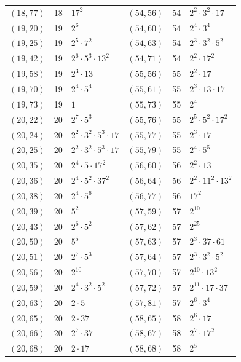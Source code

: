 \documentclass[11pt]{article}
\begin{document}
\begin{longtable}{@{}lrl@{\qquad}lrl@{}}
$(18,77)$ & 18 & $17^{2}$ & $(54,56)$ & 54 & $2^{2}\cdot 3^{2}\cdot 17$\\
$(19,20)$ & 19 & $2^{6}$ & $(54,60)$ & 54 & $2^{4}\cdot 3^{4}$\\
$(19,25)$ & 19 & $2^{5}\cdot 7^{2}$ & $(54,63)$ & 54 & $2^{3}\cdot 3^{2}\cdot 5^{2}$\\
$(19,42)$ & 19 & $2^{6}\cdot 5^{3}\cdot 13^{2}$ & $(54,71)$ & 54 & $2^{2}\cdot 17^{2}$\\
$(19,58)$ & 19 & $2^{3}\cdot 13$ & $(55,56)$ & 55 & $2^{2}\cdot 17$\\
$(19,70)$ & 19 & $2^{4}\cdot 5^{4}$ & $(55,61)$ & 55 & $2^{3}\cdot 13\cdot 17$\\
$(19,73)$ & 19 & $1$ & $(55,73)$ & 55 & $2^{4}$\\
$(20,22)$ & 20 & $2^{7}\cdot 5^{3}$ & $(55,76)$ & 55 & $2^{5}\cdot 5^{2}\cdot 17^{2}$\\
$(20,24)$ & 20 & $2^{2}\cdot 3^{2}\cdot 5^{3}\cdot 17$ & $(55,77)$ & 55 & $2^{3}\cdot 17$\\
$(20,25)$ & 20 & $2^{2}\cdot 3^{2}\cdot 5^{3}\cdot 17$ & $(55,79)$ & 55 & $2^{4}\cdot 5^{5}$\\
$(20,35)$ & 20 & $2^{4}\cdot 5\cdot 17^{2}$ & $(56,60)$ & 56 & $2^{2}\cdot 13$\\
$(20,36)$ & 20 & $2^{4}\cdot 5^{2}\cdot 37^{2}$ & $(56,64)$ & 56 & $2^{2}\cdot 11^{2}\cdot 13^{2}$\\
$(20,38)$ & 20 & $2^{4}\cdot 5^{6}$ & $(56,77)$ & 56 & $17^{2}$\\
$(20,39)$ & 20 & $5^{2}$ & $(57,59)$ & 57 & $2^{10}$\\
$(20,43)$ & 20 & $2^{6}\cdot 5^{2}$ & $(57,62)$ & 57 & $2^{25}$\\
$(20,50)$ & 20 & $5^{5}$ & $(57,63)$ & 57 & $2^{3}\cdot 37\cdot 61$\\
$(20,51)$ & 20 & $2^{7}\cdot 5^{3}$ & $(57,64)$ & 57 & $2^{3}\cdot 3^{2}\cdot 5^{2}$\\
$(20,56)$ & 20 & $2^{10}$ & $(57,70)$ & 57 & $2^{10}\cdot 13^{2}$\\
$(20,59)$ & 20 & $2^{4}\cdot 3^{2}\cdot 5^{2}$ & $(57,72)$ & 57 & $2^{11}\cdot 17\cdot 37$\\
$(20,63)$ & 20 & $2\cdot 5$ & $(57,81)$ & 57 & $2^{6}\cdot 3^{4}$\\
$(20,65)$ & 20 & $2\cdot 37$ & $(58,65)$ & 58 & $2^{6}\cdot 17$\\
$(20,66)$ & 20 & $2^{7}\cdot 37$ & $(58,67)$ & 58 & $2^{7}\cdot 17^{2}$\\
$(20,68)$ & 20 & $2\cdot 17$ & $(58,68)$ & 58 & $2^{5}$\\

\end{longtable}
\end{document}
